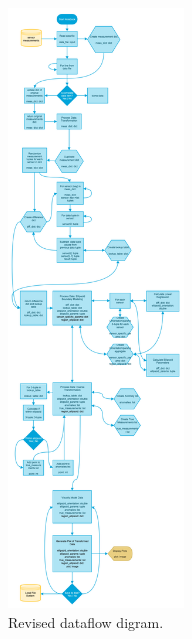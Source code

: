 \documentclass[twoside]{article}
\begin{document}
\begin{figure}[h]
\centerline{\includegraphics[width=.7\textwidth, height=600px]{"images/data_model_revised"}}
\caption{Revised dataflow digram.}
  \label{fig:revisedDataflowDiagram}
\end{figure}
\end{document}

